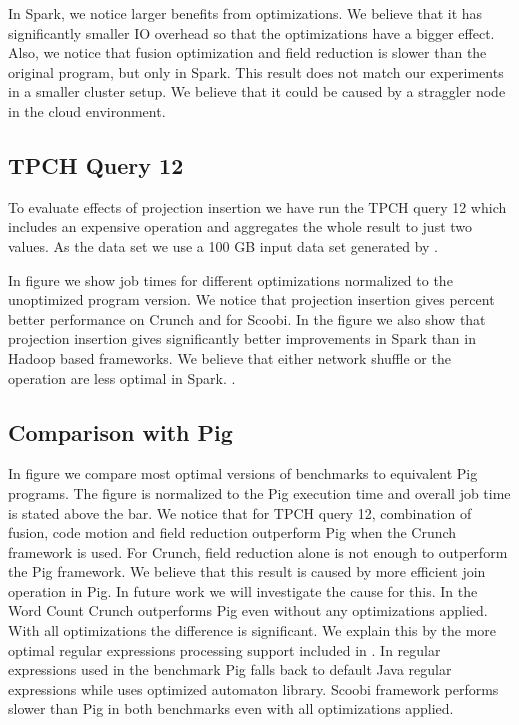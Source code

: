 In Spark, we notice larger benefits from optimizations. We believe that it has significantly smaller IO overhead so that the optimizations have a bigger effect. Also, we notice that fusion optimization and field reduction is slower than the original program, but only in Spark. This result does not match our experiments in a smaller cluster setup. We believe that it could be caused by a straggler node in the cloud environment.

\subsection{TPCH Query 12}
\label{subsec:tpch-query-12}

To evaluate effects of projection insertion we have run the TPCH query 12 which includes an expensive  operation and aggregates the whole result to just two values. As the data set we use a 100 GB input data set generated by .

In figure \todo{\ref{}} we show job times for different optimizations normalized to the unoptimized program version. We notice that projection insertion gives  percent better performance on Crunch and  for Scoobi. In the figure we also show that projection insertion gives significantly better improvements in Spark than in Hadoop based frameworks. We believe that either network shuffle or the  operation are less optimal in Spark. .


\subsection{Comparison with Pig}
\label{subsec:pig}

In figure \todo{\ref{}} we compare most optimal versions of benchmarks to equivalent Pig programs. The figure is normalized to the Pig execution time and overall job time is stated above the bar. We notice that for TPCH query 12, combination of fusion, code motion and field reduction outperform Pig when the Crunch framework is used. For Crunch, field reduction alone is not enough to outperform the Pig framework. We believe that this result is caused by more efficient join operation in Pig. In future work we will investigate the cause for this.
In the Word Count Crunch outperforms Pig even without any optimizations applied. With all optimizations the difference is significant. We explain this by the more optimal regular expressions processing support included in \tool. In regular expressions used in the benchmark Pig falls back to default Java regular expressions while \tool uses optimized automaton library. Scoobi framework performs slower than Pig in both benchmarks even with all optimizations applied.

